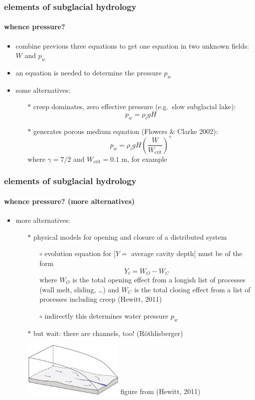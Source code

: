 \documentclass[hide notes,intlimits]{beamer}
\begin{document}
\begin{frame}
  \frametitle{elements of subglacial hydrology}
  \framesubtitle{whence pressure?}

  \begin{itemize}
    \item combine previous three equations to get one equation in two unknown fields: $W$ and $p_w$
    \item an equation is needed to determine the pressure $p_w$
    \item some alternatives:
      \begin{itemize}
      \item[$\ast$] creep dominates, zero effective pressure (e.g.~slow subglacial lake):
        $$p_w = \rho_i g H$$
      \item[$\ast$] generates porous medium equation (Flowers \& Clarke 2002):
        $$p_w = \rho_i g H \left(\frac{W}{W_{\text{crit}}}\right)^\gamma$$
        where $\gamma=7/2$ and $W_{\text{crit}}=0.1$ m, for example
      \end{itemize}
  \end{itemize}

\end{frame}


\begin{frame}
  \frametitle{elements of subglacial hydrology}
  \framesubtitle{whence pressure? (more alternatives)}

  \begin{itemize}
    \item more alternatives:
      \begin{itemize}
      \item[$\ast$] physical models for opening and closure of a distributed system
        \begin{itemize}
        \item[$\circ$]  evolution equation for [$Y=$ average cavity depth] must be of the form
        $$Y_t = W_O - W_C$$
where $W_O$ is the total opening effect from a longish list of processes (wall melt, sliding, \dots) and $W_C$ is the total closing effect from a list of processes including creep (Hewitt, 2011)
        \item[$\circ$] indirectly this determines water pressure $p_w$
        \end{itemize}
      \item[$\ast$] but wait: there are channels, too! (R\"othlisberger)

\begin{center}
\medskip
\includegraphics[width=0.4\textwidth]{figs/hewitt-cartoon} \tiny figure from (Hewitt, 2011)
\medskip
\end{center}
    \end{itemize}
  \end{itemize}
\end{frame}
\end{document}
